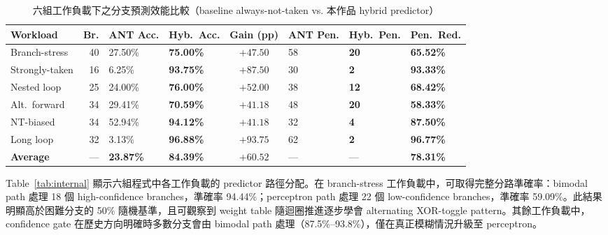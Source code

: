 \documentclass[12pt,a4paper]{article}
\begin{document}
	\begin{table}[htbp]
		\centering
		\caption{六組工作負載下之分支預測效能比較（baseline always-not-taken vs. 本作品 hybrid predictor）}
		\label{tab:results}
		\begin{tabularx}{\linewidth}{p{2.0cm}rYYcYYY}
			\toprule
			\textbf{Workload} & \textbf{Br.}
			                  & \textbf{ANT Acc.}
			                  & \textbf{Hyb.\ Acc.}
			                  & \textbf{Gain (pp)}
			                  & \textbf{ANT Pen.}
			                  & \textbf{Hyb.\ Pen.}
			                  & \textbf{Pen.\ Red.}                                                                                                \\
			\midrule
			Branch-stress     & 40                  & 27.50\%          & \textbf{75.00\%} & $+47.50$         & 58 & \textbf{20} & \textbf{65.52\%} \\
			Strongly-taken    & 16                  & 6.25\%           & \textbf{93.75\%} & $+87.50$         & 30 & \textbf{ 2} & \textbf{93.33\%} \\
			Nested loop       & 25                  & 24.00\%          & \textbf{76.00\%} & $+52.00$         & 38 & \textbf{12} & \textbf{68.42\%} \\
			Alt.\ forward     & 34                  & 29.41\%          & \textbf{70.59\%} & $+41.18$         & 48 & \textbf{20} & \textbf{58.33\%} \\
			NT-biased         & 34                  & 52.94\%          & \textbf{94.12\%} & $+41.18$         & 32 & \textbf{ 4} & \textbf{87.50\%} \\
			Long loop         & 32                  & 3.13\%           & \textbf{96.88\%} & $+93.75$         & 62 & \textbf{ 2} & \textbf{96.77\%} \\
			\midrule
			\textbf{Average}  & ---                 & \textbf{23.87\%} & \textbf{84.39\%}
			                  & $\mathbf{+60.52}$   & ---              & ---              & \textbf{78.31\%}                                       \\
			\bottomrule
		\end{tabularx}
	\end{table}

	Table~\ref{tab:internal} 顯示六組程式中各工作負載的 predictor 路徑分配。在 branch-stress 工作負載中，可取得完整分路準確率：bimodal path 處理 18 個 high-confidence branches，準確率 94.44\%；perceptron path 處理 22 個 low-confidence branches，準確率 59.09\%。此結果明顯高於困難分支的 50\% 隨機基準，且可觀察到 weight table 隨迴圈推進逐步學會 alternating XOR-toggle pattern。其餘工作負載中，confidence gate 在歷史方向明確時多數分支會由 bimodal path 處理（87.5\%--93.8\%），僅在真正模糊情況升級至 perceptron。
\end{document}
